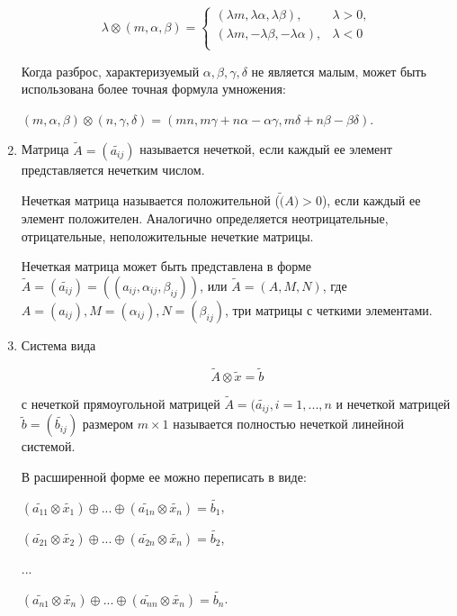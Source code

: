 \documentclass[12pt]{article}
\begin{document}
\begin{enumerate}
    $$
    \lambda \otimes (m, \alpha, \beta) = \begin{cases}
      (\lambda m, \lambda \alpha, \lambda \beta), & \lambda > 0, \\
      (\lambda m, - \lambda \beta, - \lambda \alpha), & \lambda < 0 \\
    \end{cases}
    $$

    Когда разброс, характеризуемый $\alpha, \beta, \gamma, \delta$ не является
    малым, может быть использована более точная формула умножения:

    $ (m, \alpha, \beta) \otimes (n, \gamma, \delta) = (mn, m \gamma + n \alpha -
    \alpha \gamma, m \delta + n \beta - \beta \delta )$.

  \item
    Матрица $\tilde{A} = (\tilde{a_{ij}})$ называется нечеткой, если каждый ее
    элемент представляется нечетким числом.

    Нечеткая матрица называется положительной ($\tilde(A) > 0$), если каждый ее
    элемент положителен. Аналогично определяется неотрицательные, отрицательные,
    неположительные нечеткие матрицы.

    Нечеткая матрица может быть представлена в форме $\tilde{A} =
    (\tilde{a_{ij}}) = ((a_{ij}, \alpha_{ij}, \beta_{ij}))$, или
    $\tilde{A} = (A, M, N)$, где $A = (a_{ij}), M = (\alpha_{ij}), N =
    (\beta_{ij})$, три матрицы с четкими элементами.

  \item
    Система вида

    $$
    \tilde{A} \otimes \tilde{x} = \tilde{b}
    $$

    с нечеткой прямоугольной матрицей $\tilde{A} = (\tilde{a_{ij}}, i = 1,...,n$
    и нечеткой матрицей $\tilde{b} = (\tilde{b_{ij}})$ размером $m \times 1$
    называется полностью нечеткой линейной системой.

    В расширенной форме ее можно переписать в виде:

    \begin{center}

    $(\tilde{a_{11}} \otimes \tilde{x_1}) \oplus ... \oplus (\tilde{a_{1n}}
    \otimes \tilde{x_n}) = \tilde{b_1}$,

    $(\tilde{a_{21}} \otimes \tilde{x_2}) \oplus ... \oplus (\tilde{a_{2n}}
    \otimes \tilde{x_n}) = \tilde{b_2}$, 

    ...

    $(\tilde{a_{n1}} \otimes \tilde{x_n}) \oplus ... \oplus (\tilde{a_{nn}}
    \otimes \tilde{x_n}) = \tilde{b_n}$.
    \end{center}

\end{enumerate}
\end{document}
